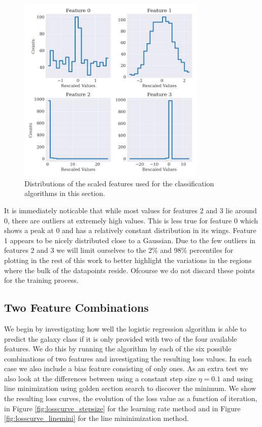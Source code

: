 \begin{figure}
    \centering
    \includegraphics[width=0.8\textwidth]{results/scaled_features_dist.png}
    \caption{Distributions of the scaled features used for the classification algorithms in this section.}
    \label{fig:feat_dist}
\end{figure}

It is immediately noticable that while most values for features 2 and 3 lie around 0, there are outliers at extremely high values. This is less true for feature 0 which shows a peak at 0 and has a relatively constant distribution in its wings. Feature 1 appears to be nicely distributed close to a Gaussian. Due to the few outliers in features 2 and 3 we will limit ourselves to the 2\% and 98\% percentiles for plotting in the rest of this work to better highlight the variations in the regions where the bulk of the datapoints reside. Ofcourse we do not discard these points for the training process.

\subsection{Two Feature Combinations}


We begin by investigating how well the logistic regression algorithm is able to predict the galaxy class if it is only provided with two of the four available features. We do this by running the algorithm by each of the six possible combinations of two features and investigating the resulting loss values. In each case we also include a bias feature consisting of only ones. As an extra test we also look at the differences between using a constant step size $\eta = 0.1$ and using line minimization using golden section search to discover the minimum. We show the resulting loss curves, the evolution of the loss value as a function of iteration, in Figure \ref{fig:losscurve_stepsize} for the learning rate method and in Figure \ref{fig:losscurve_linemini} for the line mininimization method. 

